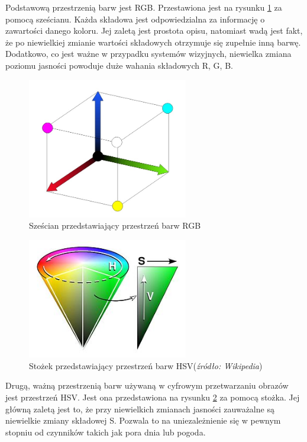 Podstawową przestrzenią barw jest RGB. 
Przestawiona jest na rysunku \ref{fig:rgb} za pomocą sześcianu. 
Każda składowa jest odpowiedzialna za informację o zawartości danego koloru. 
Jej zaletą jest prostota opisu, natomiast wadą jest fakt, że po niewielkiej zmianie wartości składowych otrzymuje się zupełnie inną barwę. 
Dodatkowo, co jest ważne w przypadku systemów wizyjnych, niewielka zmiana poziomu jasności powoduje duże wahania składowych R, G, B.

\begin{figure}
  \centering
  \includegraphics[width=7cm]{img/rgb.jpg}
  \caption{Sześcian przedstawiający przestrzeń barw RGB\cite{W4}}
  \label{fig:rgb}
\end{figure}


\begin{figure}
  \centering
  \includegraphics[width=7cm]{img/hsv.jpg}
  \caption{Stożek przedstawiający przestrzeń barw HSV(\textit{źródło: Wikipedia})}
  \label{fig:hsv}
\end{figure}

Drugą, ważną przestrzenią barw używaną w cyfrowym przetwarzaniu obrazów jest przestrzeń HSV. 
Jest ona przedstawiona na rysunku \ref{fig:hsv} za pomocą stożka. 
Jej główną zaletą jest to, że przy niewielkich zmianach jasności zauważalne są niewielkie zmiany składowej S. %
Pozwala to na uniezależnienie się w pewnym stopniu od czynników takich jak pora dnia lub pogoda.

